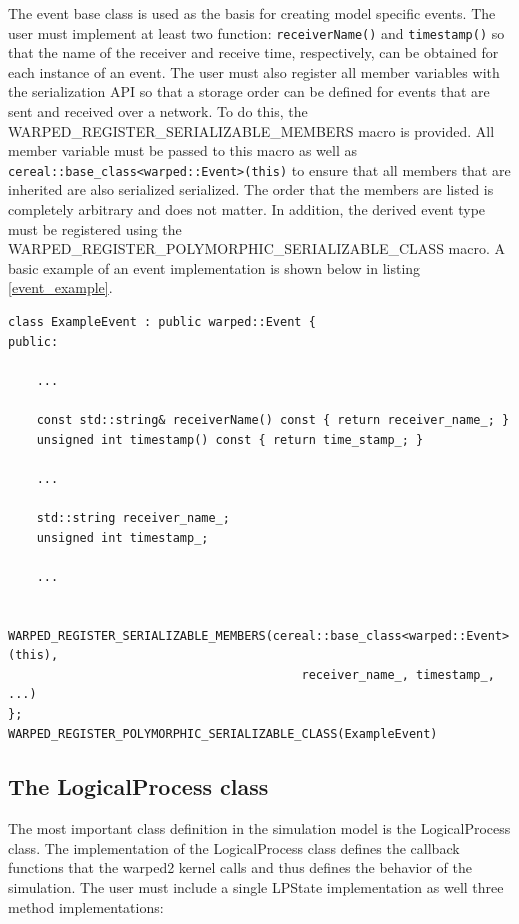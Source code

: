 \documentclass[11pt]{book}
\begin{document}
The event base class is used as the basis for creating model specific events. The user must
implement at least two function: \texttt{receiverName()} and \texttt{timestamp()} so that
the name of the receiver and receive time, respectively, can be obtained for each instance
of an event. The user must also register all member variables with the serialization API so
that a storage order can be defined for events that are sent and received over a network.
To do this, the WARPED\_REGISTER\_SERIALIZABLE\_MEMBERS macro is provided. All member
variable must be passed to this macro as well as
\texttt{cereal::base\_class<warped::Event>(this)} to ensure that all members that are
inherited are also serialized serialized. The order that the members are listed is completely
arbitrary and does not matter. In addition, the derived event type must be registered using
the WARPED\_REGISTER\_POLYMORPHIC\_SERIALIZABLE\_CLASS macro. A basic example of an event
implementation is shown below in listing \ref{event_example}.

\begin{lstlisting}[caption=Sample \textsc{warped2} Event Definition, label=event_example, float]
class ExampleEvent : public warped::Event {
public:

    ...

    const std::string& receiverName() const { return receiver_name_; }
    unsigned int timestamp() const { return time_stamp_; }

    ...

    std::string receiver_name_;
    unsigned int timestamp_;

    ...

    WARPED_REGISTER_SERIALIZABLE_MEMBERS(cereal::base_class<warped::Event>(this),
                                         receiver_name_, timestamp_, ...)
};
WARPED_REGISTER_POLYMORPHIC_SERIALIZABLE_CLASS(ExampleEvent)
\end{lstlisting}

\subsection{The LogicalProcess class}

The most important class definition in the simulation model is the LogicalProcess class.
The implementation of the LogicalProcess class defines the callback functions that the
warped2 kernel calls and thus defines the behavior of the simulation. The user must include
a single LPState implementation as well three method implementations:
\end{document}

